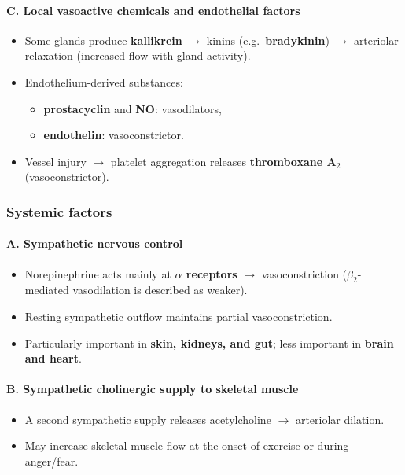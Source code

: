 \documentclass[11pt,a4paper]{article}
\begin{document}
\paragraph{C. Local vasoactive chemicals and endothelial factors}
\begin{itemize}
\item Some glands produce \textbf{kallikrein} $\rightarrow$ kinins (e.g.\ \textbf{bradykinin}) $\rightarrow$ arteriolar relaxation (increased flow with gland activity).
\item Endothelium-derived substances:
  \begin{itemize}
  \item \textbf{prostacyclin} and \textbf{NO}: vasodilators,
  \item \textbf{endothelin}: vasoconstrictor.
  \end{itemize}
\item Vessel injury $\rightarrow$ platelet aggregation releases \textbf{thromboxane A$_2$} (vasoconstrictor).
\end{itemize}

\subsubsection{Systemic factors}

\paragraph{A. Sympathetic nervous control}
\begin{itemize}
\item Norepinephrine acts mainly at \textbf{$\alpha$ receptors} $\rightarrow$ vasoconstriction ($\beta_2$-mediated vasodilation is described as weaker).
\item Resting sympathetic outflow maintains partial vasoconstriction.
\item Particularly important in \textbf{skin, kidneys, and gut}; less important in \textbf{brain and heart}.
\end{itemize}

\paragraph{B. Sympathetic cholinergic supply to skeletal muscle}
\begin{itemize}
\item A second sympathetic supply releases acetylcholine $\rightarrow$ arteriolar dilation.
\item May increase skeletal muscle flow at the onset of exercise or during anger/fear.
\end{itemize}
\end{document}
